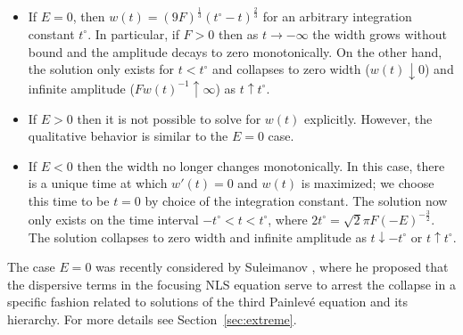 \documentclass[12pt]{amsart}
\numberwithin{equation}{section}
\begin{document}
\begin{itemize}
\item If $E=0$, then $w(t)=(9F)^\frac{1}{3}(t^\circ-t)^\frac{2}{3}$ for an 
arbitrary integration constant $t^\circ$.  In particular, if $F>0$ then 
as $t\to -\infty$ the width grows without bound and the amplitude 
decays to zero monotonically.  On the other hand, the solution only exists 
for $t<t^\circ$ and collapses to zero width ($w(t)\downarrow 0$) and infinite 
amplitude ($Fw(t)^{-1}\uparrow \infty$) as $t\uparrow t^\circ$.  
\item If $E>0$ then it is not possible to solve for $w(t)$ explicitly.  
However, the qualitative behavior is similar to the $E=0$ case.
\item If $E<0$ then the width no longer changes monotonically.  In this case, 
there is a unique time at which $w'(t)=0$ and $w(t)$ is maximized;  we choose this time to be $t=0$ 
by choice of the integration constant.  The solution now only exists on the 
time interval $-t^\circ < t < t^\circ$, where
$2t^\circ = \sqrt{2}\pi F(-E)^{-\frac{3}{2}}$.  The solution 
collapses to zero width and infinite amplitude as $t\downarrow-t^\circ$ or 
$t\uparrow t^\circ$.   
\end{itemize}
The case $E=0$ was recently considered by Suleimanov \cite{Suleimanov17}, 
where he proposed that the dispersive terms in the focusing NLS equation 
serve to arrest the collapse in a specific fashion related to solutions of 
the third Painlev\'e equation and its hierarchy.  For more details see Section~\ref{sec:extreme}.  
\end{document}

